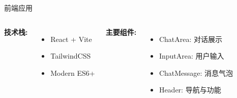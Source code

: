 \documentclass{beamer}
\begin{document}
\begin{frame}{前端应用}
    \begin{columns}[T]
        \textbf{技术栈:}
        \begin{itemize}
            \item React + Vite
            \item TailwindCSS
            \item Modern ES6+
        \end{itemize}
        \vspace{0.3cm}
        \textbf{主要组件:}
        \begin{itemize}
            \item ChatArea: 对话展示
            \item InputArea: 用户输入
            \item ChatMessage: 消息气泡
            \item Header: 导航与功能
        \end{itemize}
        

\end{columns}
\end{frame}
\end{document}
